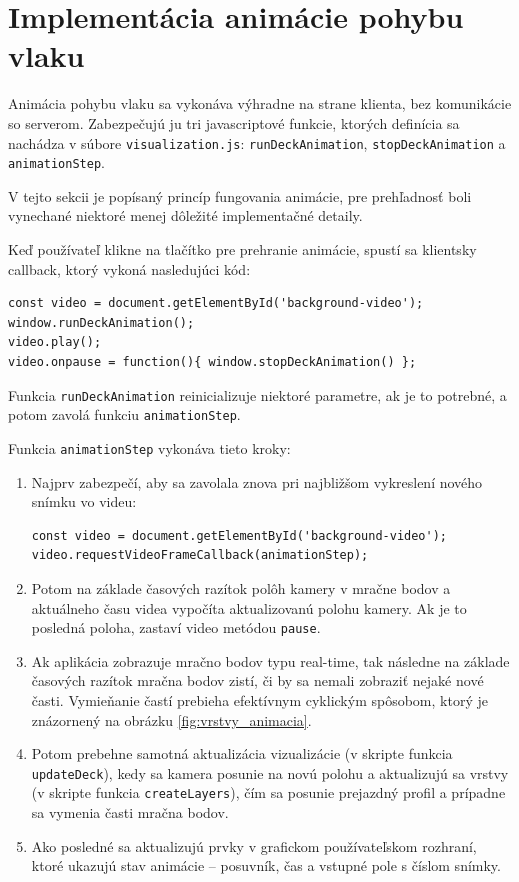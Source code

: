 \section{Implementácia animácie pohybu vlaku}
\label{sec:implementacia_animacie}

Animácia pohybu vlaku sa vykonáva výhradne na strane klienta, bez komunikácie so serverom. Zabezpečujú ju tri javascriptové funkcie, ktorých definícia sa nachádza v súbore \texttt{visualization.js}: \texttt{runDeckAnimation}, \texttt{stopDeckAnimation} a \texttt{animationStep}.

V tejto sekcii je popísaný princíp fungovania animácie, pre prehľadnosť boli vynechané niektoré menej dôležité implementačné detaily.

Keď používateľ klikne na tlačítko pre prehranie animácie, spustí sa klientsky callback, ktorý vykoná nasledujúci kód:

\begin{lstlisting}
const video = document.getElementById('background-video');
window.runDeckAnimation();
video.play();
video.onpause = function(){ window.stopDeckAnimation() };
\end{lstlisting}

Funkcia \texttt{runDeckAnimation} reinicializuje niektoré parametre, ak je to potrebné, a potom zavolá funkciu \texttt{animationStep}.

Funkcia \texttt{animationStep} vykonáva tieto kroky:

\begin{enumerate}
    \item Najprv zabezpečí, aby sa zavolala znova pri najbližšom vykreslení nového snímku vo videu:
    \begin{lstlisting}
const video = document.getElementById('background-video');
video.requestVideoFrameCallback(animationStep);
    \end{lstlisting}

    \item Potom na základe časových razítok polôh kamery v mračne bodov a aktuálneho času videa vypočíta aktualizovanú polohu kamery. Ak je to posledná poloha, zastaví video metódou \texttt{pause}.

    \item Ak aplikácia zobrazuje mračno bodov typu real-time, tak následne na základe časových razítok mračna bodov zistí, či by sa nemali zobraziť nejaké nové časti. Vymieňanie častí prebieha efektívnym cyklickým spôsobom, ktorý je znázornený na obrázku \ref{fig:vrstvy_animacia}.

    \item Potom prebehne samotná aktualizácia vizualizácie (v skripte funkcia \texttt{updateDeck}), kedy sa kamera posunie na novú polohu a aktualizujú sa vrstvy (v skripte funkcia \texttt{createLayers}), čím sa posunie prejazdný profil a prípadne sa vymenia časti mračna bodov.

    \item Ako posledné sa aktualizujú prvky v grafickom používateľskom rozhraní, ktoré ukazujú stav animácie -- posuvník, čas a vstupné pole s číslom snímky.
\end{enumerate}

